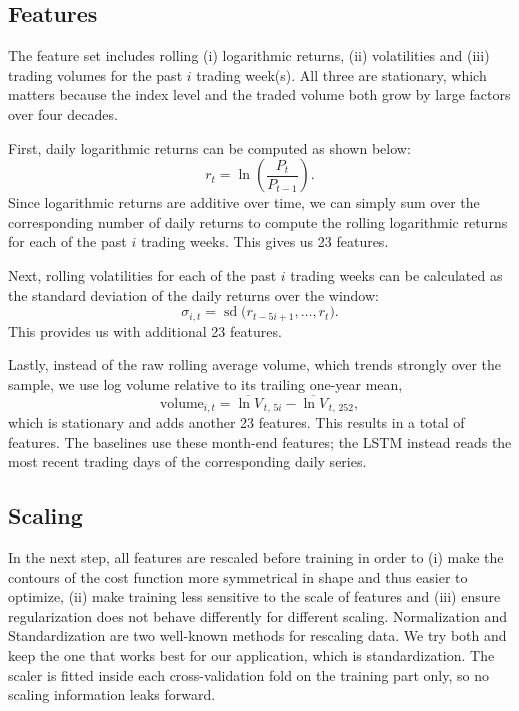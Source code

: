 \documentclass[10pt]{article}
\begin{document}
\subsection{Features}

The feature set includes rolling (i) logarithmic returns, (ii) volatilities and
(iii) trading volumes for the past $i$ trading week(s). All three are stationary,
which matters because the index level and the traded volume both grow by large
factors over four decades.

First, daily logarithmic returns can be computed as shown below:
\begin{equation}
  r_t = \ln\!\left(\frac{P_t}{P_{t-1}}\right).
\end{equation}
Since logarithmic returns are additive over time, we can simply sum over the
corresponding number of daily returns to compute the rolling logarithmic returns
for each of the past $i$ trading weeks. This gives us 23 features.

Next, rolling volatilities for each of the past $i$ trading weeks can be calculated
as the standard deviation of the daily returns over the window:
\begin{equation}
  \sigma_{i,t} = \operatorname{sd}\big(r_{t-5i+1}, \dots, r_t\big).
\end{equation}
This provides us with additional 23 features.

Lastly, instead of the raw rolling average volume, which trends strongly over the
sample, we use log volume relative to its trailing one-year mean,
\begin{equation}
  \text{volume}_{i,t} = \overline{\ln V}_{\,t,\,5i} - \overline{\ln V}_{\,t,\,252},
\end{equation}
which is stationary and adds another 23 features. This results in a total of
\nFeatures{} features. The baselines use these month-end features; the LSTM instead
reads the most recent \lookback{} trading days of the corresponding daily series.

\subsection{Scaling}

In the next step, all features are rescaled before training in order to (i) make
the contours of the cost function more symmetrical in shape and thus easier to
optimize, (ii) make training less sensitive to the scale of features and (iii)
ensure regularization does not behave differently for different scaling.
Normalization and Standardization are two well-known methods for rescaling data. We
try both and keep the one that works best for our application, which is
standardization. The scaler is fitted inside each cross-validation fold on the
training part only, so no scaling information leaks forward.
\end{document}
